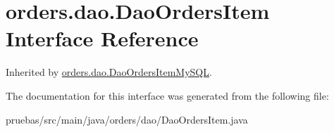 \hypertarget{interfaceorders_1_1dao_1_1_dao_orders_item}{}\section{orders.\+dao.\+Dao\+Orders\+Item Interface Reference}
\label{interfaceorders_1_1dao_1_1_dao_orders_item}


Inherited by \mbox{\hyperlink{classorders_1_1dao_1_1_dao_orders_item_my_s_q_l}{orders.\+dao.\+Dao\+Orders\+Item\+My\+S\+QL}}.



The documentation for this interface was generated from the following file\+:\begin{DoxyCompactItemize}
\item 
pruebas/src/main/java/orders/dao/Dao\+Orders\+Item.\+java\end{DoxyCompactItemize}
